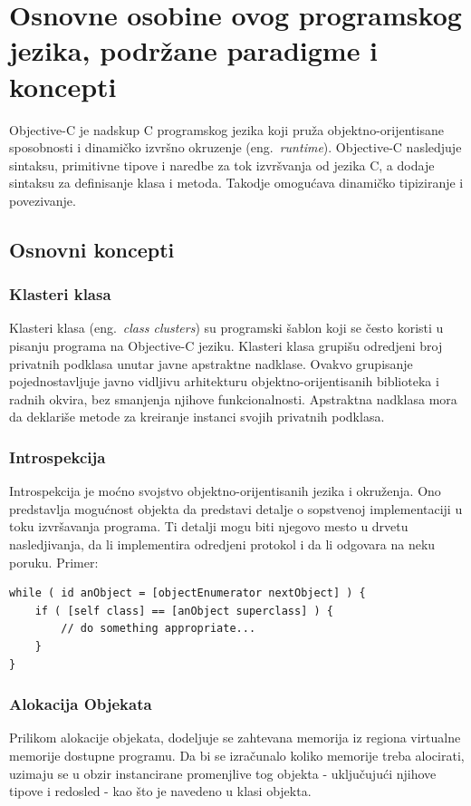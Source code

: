 \documentclass[a4paper]{article}
\begin{document}
\section{Osnovne osobine ovog programskog jezika, podržane paradigme i koncepti}
\label{sec:osobine}
Objective-C je nadskup C programskog jezika koji pruža objektno-orijentisane sposobnosti i dinamičko izvršno okruzenje (eng.~{\em runtime}). Objective-C nasledjuje sintaksu, primitivne tipove i naredbe za tok izvršvanja od jezika C, a dodaje sintaksu za definisanje klasa i metoda. Takodje omogućava dinamičko tipiziranje i povezivanje.
\subsection{Osnovni koncepti}
\subsubsection{Klasteri klasa}
Klasteri klasa (eng.~{\em class clusters}) su programski šablon koji se često koristi u pisanju programa na Objective-C jeziku. Klasteri klasa grupišu odredjeni broj privatnih podklasa unutar javne apstraktne nadklase. 
Ovakvo grupisanje pojednostavljuje javno vidljivu arhitekturu objektno-orijentisanih biblioteka i radnih okvira, bez smanjenja njihove funkcionalnosti. Apstraktna nadklasa mora da deklariše metode za kreiranje instanci svojih privatnih podklasa. 
\subsubsection{Introspekcija}
Introspekcija je moćno svojstvo objektno-orijentisanih jezika i okruženja. Ono predstavlja mogućnost objekta da predstavi detalje o sopstvenoj implementaciji u toku izvršavanja programa. Ti detalji mogu biti njegovo mesto u drvetu nasledjivanja, da li implementira odredjeni protokol i da li odgovara na neku poruku. Primer: 
\begin{lstlisting}[frame=single]
while ( id anObject = [objectEnumerator nextObject] ) {
    if ( [self class] == [anObject superclass] ) {
        // do something appropriate...
    }
}
\end{lstlisting}
\subsubsection{Alokacija Objekata}
Prilikom alokacije objekata, dodeljuje se zahtevana memorija iz regiona virtualne memorije dostupne programu. Da bi se izračunalo koliko memorije treba alocirati, uzimaju se u obzir instancirane promenjlive tog objekta - uključujući njihove tipove i redosled - kao što je navedeno u klasi objekta.
\end{document}
